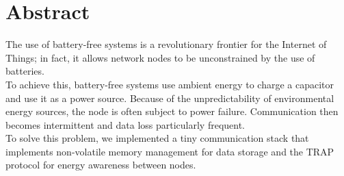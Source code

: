 \chapter*{Abstract} %
\label{summary}

The use of battery-free systems is a revolutionary frontier for the Internet of Things; in fact, it allows network nodes to be unconstrained by the use of batteries.\\
To achieve this, battery-free systems use ambient energy to charge a capacitor and use it as a power source. Because of the unpredictability of environmental energy sources, the node is often subject to power failure.
Communication then becomes intermittent and data loss particularly frequent.\\
To solve this problem, we implemented a tiny communication stack that implements non-volatile memory management for data storage and the TRAP protocol for energy awareness between nodes.
\newpage


